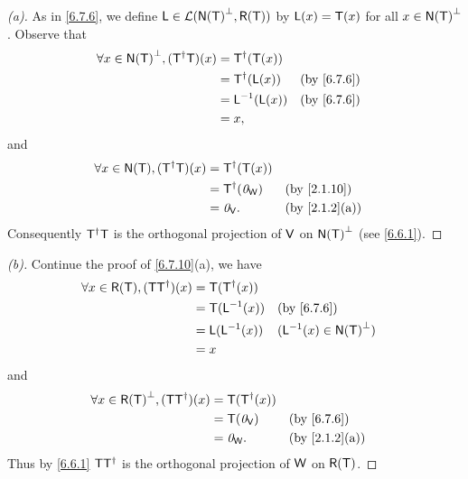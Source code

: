 \begin{proof}[(a)]
  As in \cref{6.7.6}, we define \(\lt{L} \in \ls(\ns{\T}^{\perp}, \rg{\T})\) by \(\mathsf{L}(x) = \mathsf{T}(x)\) for all \(x \in \ns{\T}^{\perp}\).
  Observe that
  \begin{align*}
    \forall x \in \ns{\T}^{\perp}, (\T^{\dag} \T)(x) & = \T^{\dag}(\T(x))                       \\
                                                     & = \T^{\dag}(\lt{L}(x))   &  & \by{6.7.6} \\
                                                     & = \lt{L}^{-1}(\lt{L}(x)) &  & \by{6.7.6} \\
                                                     & = x,
  \end{align*}
  and
  \begin{align*}
    \forall x \in \ns{\T}, (\T^{\dag} \T)(x) & = \T^{\dag}(\T(x))                       \\
                                             & = \T^{\dag}(\zv_{\W}) &  & \by{2.1.10}   \\
                                             & = \zv_{\V}.           &  & \by{2.1.2}[a]
  \end{align*}
  Consequently \(\mathsf{T}^{\dag} \mathsf{T}\) is the orthogonal projection of \(\mathsf{V}\) on \(\ns{\T}^{\perp}\) (see \cref{6.6.1}).
\end{proof}

\begin{proof}[(b)]
  Continue the proof of \cref{6.7.10}(a), we have
  \begin{align*}
    \forall x \in \rg{\T}, (\T \T^{\dag})(x) & = \T(\T^{\dag}(x))                                                 \\
                                             & = \T(\lt{L}^{-1}(x))     &  & \by{6.7.6}                           \\
                                             & = \lt{L}(\lt{L}^{-1}(x)) &  & (\lt{L}^{-1}(x) \in \ns{\T}^{\perp}) \\
                                             & = x
  \end{align*}
  and
  \begin{align*}
    \forall x \in \rg{\T}^{\perp}, (\T \T^{\dag})(x) & = \T(\T^{\dag}(x))                    \\
                                                     & = \T(\zv_{\V})     &  & \by{6.7.6}    \\
                                                     & = \zv_{\W}.        &  & \by{2.1.2}[a]
  \end{align*}
  Thus by \cref{6.6.1} \(\mathsf{T} \mathsf{T}^{\dag}\) is the orthogonal projection of \(\mathsf{W}\) on \(\rg{\T}\).
\end{proof}

